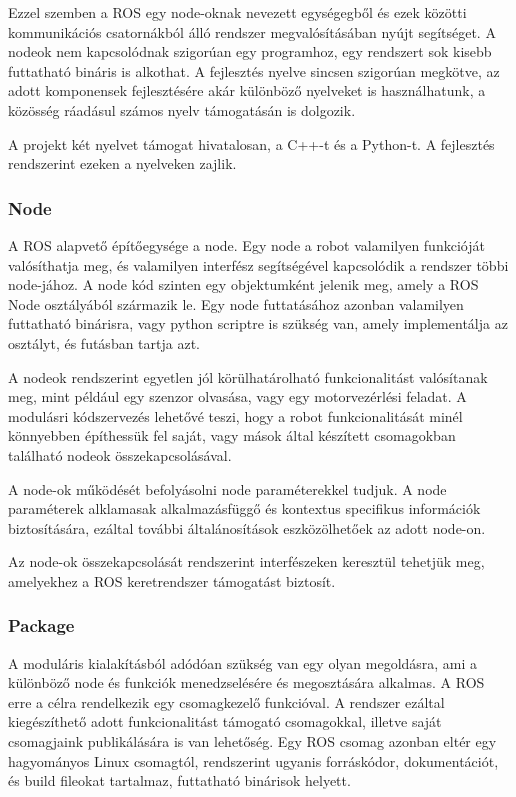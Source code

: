 Ezzel szemben a ROS egy node-oknak nevezett egységegből és ezek közötti
kommunikációs csatornákból álló rendszer megvalósításában nyújt segítséget. A
nodeok nem kapcsolódnak szigorúan egy programhoz, egy rendszert sok kisebb
futtatható bináris is alkothat. A fejlesztés nyelve sincsen szigorúan megkötve, az
adott komponensek fejlesztésére akár különböző nyelveket is használhatunk, a
közösség ráadásul számos nyelv támogatásán is dolgozik.

A projekt két nyelvet támogat hivatalosan, a C++-t és a Python-t. A fejlesztés
rendszerint ezeken a nyelveken zajlik.

\subsubsection{Node}

A ROS alapvető építőegysége a node. Egy node a robot valamilyen funkcióját
valósíthatja meg, és valamilyen interfész segítségével kapcsolódik a rendszer
többi node-jához. A node kód szinten egy objektumként jelenik meg, amely a ROS
Node osztályából származik le. Egy node futtatásához azonban valamilyen
futtatható binárisra, vagy python scriptre is szükség van, amely implementálja az
osztályt, és futásban tartja azt.

A nodeok rendszerint egyetlen jól körülhatárolható funkcionalitást valósítanak
meg, mint például egy szenzor olvasása, vagy egy motorvezérlési feladat. A
modulásri kódszervezés lehetővé teszi, hogy a robot funkcionalitását minél
könnyebben építhessük fel saját, vagy mások által készített csomagokban található
nodeok összekapcsolásával.

A node-ok működését befolyásolni node paraméterekkel tudjuk. A node paraméterek
alklamasak alkalmazásfüggő és kontextus specifikus információk biztosítására,
ezáltal további általánosítások eszközölhetőek az adott node-on.

Az node-ok összekapcsolását rendszerint interfészeken keresztül tehetjük meg,
amelyekhez a ROS keretrendszer támogatást biztosít.

\subsubsection{Package}

A moduláris kialakításból adódóan szükség van egy olyan megoldásra, ami a
különböző node és funkciók menedzselésére és megosztására alkalmas. A ROS erre a
célra rendelkezik egy csomagkezelő funkcióval. A rendszer ezáltal kiegészíthető
adott funkcionalitást támogató csomagokkal, illetve saját csomagjaink
publikálására is van lehetőség. Egy ROS csomag azonban eltér egy hagyományos
Linux csomagtól, rendszerint ugyanis forráskódor, dokumentációt, és build
fileokat tartalmaz, futtatható binárisok helyett. 

